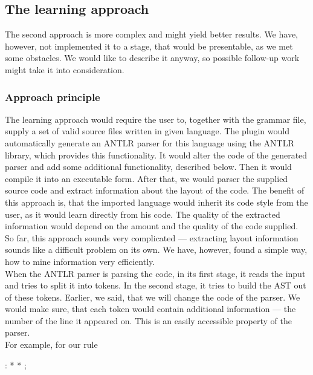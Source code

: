 \subsection{The learning approach}
\label{chap:learning_approach}

The second approach is more complex and might yield better results.
We have, however, not implemented it to a stage, that would be presentable, as we met some obstacles.
We would like to describe it anyway, so possible follow-up work might take it into consideration.
\\

\subsubsection{Approach principle}

The learning approach would require the user to, together with the grammar file, supply a set of valid source files written in given language.
The plugin would automatically generate an ANTLR parser for this language using the ANTLR library, which provides this functionality.
It would alter the code of the generated parser and add some additional functionality, described below.
Then it would compile it into an executable form.
After that, we would parser the supplied source code and extract information about the layout of the code.
The benefit of this approach is, that the imported language would inherit its code style from the user, as it would learn directly from his code.
The quality of the extracted information would depend on the amount and the quality of the code supplied.
So far, this approach sounds very complicated --- extracting layout information sounds like a difficult problem on its own.
We have, however, found a simple way, how to mine information very efficiently.
\\

When the ANTLR parser is parsing the code, in its first stage, it reads the input and tries to split it into tokens.
In the second stage, it tries to build the AST out of these tokens.
Earlier, we said, that we will change the code of the parser.
We would make sure, that each token would contain additional information --- the number of the line it appeared on.
This is an easily accessible property of the parser.
\\

\noindent
For example, for our  rule

\begin{antlr}
	  :   \literal{<}  * \literal{>} * \literal{</}  \literal{>} ;
\end{antlr}

